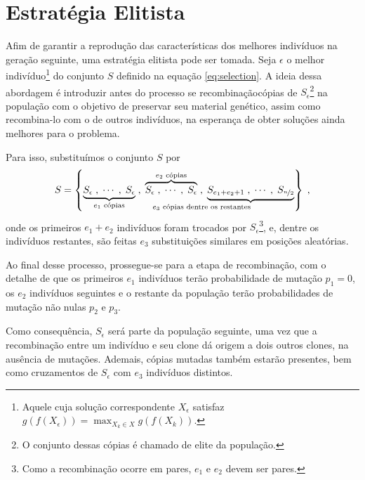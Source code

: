 \section{Estratégia Elitista}

Afim de garantir a reprodução das características dos melhores indivíduos na geração seguinte, uma
estratégia elitista pode ser tomada. Seja $\epsilon$ o melhor indivíduo\footnote{
  Aquele cuja solução correspondente $X_{\epsilon}$ satisfaz $ g(f(X_{\epsilon})) = \max_{X_k \in X} g(f(X_k)) $.
}
do conjunto $S$ definido na equação \ref{eq:selection}. A ideia dessa abordagem é introduzir\trav
antes do processo se recombinação\trav cópias de $S_{\epsilon}$\footnote{
  O conjunto dessas cópias é chamado de elite da população.
}
na população com o objetivo de
preservar seu material genético, assim como recombina-lo com o de outros indivíduos, na esperança
de obter soluções ainda melhores para o problema.

Para isso, substituímos o conjunto $S$ por
\begin{equation}
  S =
  \left\{
  \underbrace{S_{\epsilon}\;, \mathdots,  \;S_{\epsilon}}_{e_1 \text{ cópias}}\;,\;
  \overbrace{S_{\epsilon}\;, \mathdots,  \;S_{\epsilon}}^{e_2 \text{ cópias}}\;,\;
  \underbrace{S_{e_1 + e_2 + 1}\;, \mathdots,  \;S_{\nicefrac{n}{2}}}_{\mathllap{e_3 \text{ cópias dentre os restantes}}}
  \right\}
  \mathcomma
\end{equation}
onde os primeiros $e_1 + e_2$ indivíduos foram trocados por $S_{\epsilon}$\footnote{
  Como a recombinação ocorre em pares, $e_1$ e $e_2$ devem ser pares.
}, e, dentre os indivíduos restantes,
são feitas $e_3$ substituições similares em posições aleatórias.

Ao final desse processo, prossegue-se para a etapa de recombinação, com o detalhe de que os primeiros $e_1$
indivíduos terão probabilidade de mutação $p_1 = 0$, os $e_2$ indivíduos seguintes e o restante da população
terão probabilidades de mutação não nulas $p_2$ e $p_3$.

Como consequência, $S_{\epsilon}$ será parte da população seguinte, uma vez que a recombinação entre um
indivíduo e seu clone dá origem a dois outros clones, na ausência de mutações. Ademais, cópias mutadas
também estarão presentes, bem como cruzamentos de $S_{\epsilon}$ com $e_3$ indivíduos distintos.